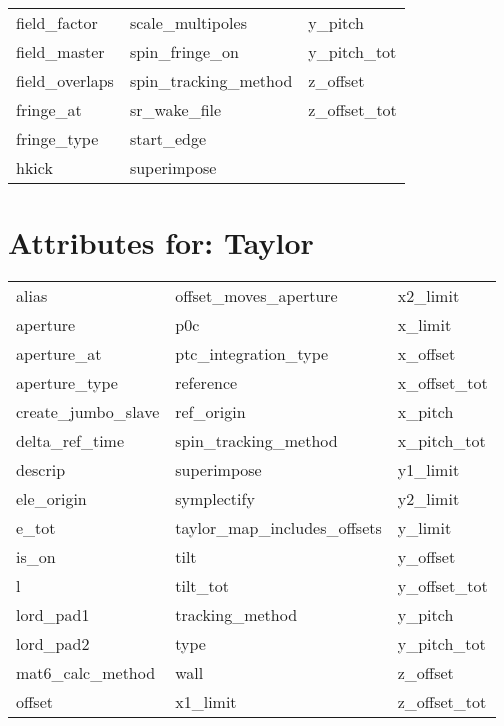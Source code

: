 \begin{tabular}{lll}
field_factor                & scale_multipoles            & y_pitch                     \\
field_master                & spin_fringe_on              & y_pitch_tot                 \\
field_overlaps              & spin_tracking_method        & z_offset                    \\
fringe_at                   & sr_wake_file                & z_offset_tot                \\
fringe_type                 & start_edge                  &                             \\
hkick                       & superimpose                 &                             \\
 \bottomrule
 \end{tabular}
 \vfill
 
 \section{Attributes for: Taylor}
 \label{s:list.taylor}
 
 \begin{tabular}{lll} \toprule
alias                       & offset_moves_aperture       & x2_limit                    \\
aperture                    & p0c                         & x_limit                     \\
aperture_at                 & ptc_integration_type        & x_offset                    \\
aperture_type               & reference                   & x_offset_tot                \\
create_jumbo_slave          & ref_origin                  & x_pitch                     \\
delta_ref_time              & spin_tracking_method        & x_pitch_tot                 \\
descrip                     & superimpose                 & y1_limit                    \\
ele_origin                  & symplectify                 & y2_limit                    \\
e_tot                       & taylor_map_includes_offsets & y_limit                     \\
is_on                       & tilt                        & y_offset                    \\
l                           & tilt_tot                    & y_offset_tot                \\
lord_pad1                   & tracking_method             & y_pitch                     \\
lord_pad2                   & type                        & y_pitch_tot                 \\
mat6_calc_method            & wall                        & z_offset                    \\
offset                      & x1_limit                    & z_offset_tot                \\
 \bottomrule
 \end{tabular}
 \vfill
 
